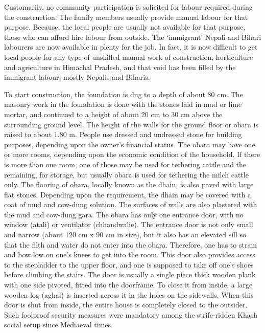 Customarily, no community participation is solicited for labour required during the construction. The family members usually provide manual labour for that purpose. Because, the local people are usually not available for that purpose, those who can afford hire labour from outside. The ‘immigrant’ Nepali and Bihari labourers are now available in plenty for the job. In fact, it is now difficult to get local people for any type of unskilled manual work of construction, horticulture and agriculture in Himachal Pradesh, and that void has been filled by the immigrant labour, mostly Nepalis and Biharis.

To start construction, the foundation is dug to a depth of about 80 cm. The masonry work in the foundation is done with the stones laid in mud or lime mortar, and continued to a height of about 20 cm to 30 cm above the surrounding ground level. The height of the walls for the ground floor or obara is raised to about 1.80 m. People use dressed and undressed stone for building purposes, depending upon the owner’s financial status. The obara may have one or more rooms, depending upon the economic condition of the household. If there is more than one room, one of those may be used for tethering cattle and the remaining, for storage, but usually obara is used for tethering the milch cattle only. The flooring of obara, locally known as the dhain, is also paved with large flat stones. Depending upon the requirement, the dhain may be covered with a coat of mud and cow-dung solution. The surfaces of walls are also plastered with the mud and cow-dung gara. The obara has only one entrance door, with no window (atali) or ventilator (chhandwalie). The entrance door is not only small and narrow (about 120 cm x 90 cm in size), but it also has an elevated sill so that the filth and water do not enter into the obara. Therefore, one has to strain and bow low on one’s knees to get into the room. This door also provides access to the stepladder to the upper floor, and one is supposed to take off one’s shoes before climbing the stairs. The door is usually a single piece thick wooden plank with one side pivoted, fitted into the doorframe. To close it from inside, a large wooden log (aghal) is inserted across it in the holes on the sidewalls. When this door is shut from inside, the entire house is completely closed to the outsider. Such foolproof security measures were mandatory among the strife-ridden Khash social setup since Mediaeval times.

